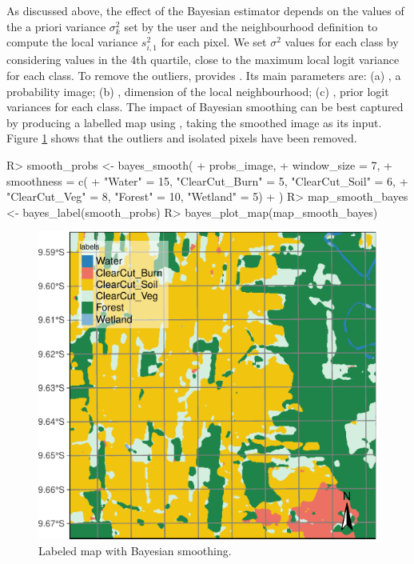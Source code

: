 \documentclass[
  shortnames]{jss}
\begin{document}
As discussed above, the effect of the Bayesian estimator depends on the values of the a priori variance \(\sigma^2_{k}\) set by the user and the neighbourhood definition to compute the local variance \(s^2_{i,1}\) for each pixel. We set \(\sigma^2\) values for each class by considering values in the 4th quartile, close to the maximum local logit variance for each class. To remove the outliers,  provides . Its main parameters are: (a) , a probability image; (b) , dimension of the local neighbourhood; (c) , prior logit variances for each class. The impact of Bayesian smoothing can be best captured by producing a labelled map using , taking the smoothed image as its input. Figure \ref{fig:smth1} shows that the outliers and isolated pixels have been removed.

\begin{CodeChunk}
\begin{CodeInput}
R> smooth_probs <- bayes_smooth(
+     probs_image,
+     window_size = 7,
+     smoothness = c(
+       "Water" = 15, "ClearCut_Burn" = 5, "ClearCut_Soil" = 6, 
+       "ClearCut_Veg" =  8, "Forest" = 10, "Wetland" = 5)
+ )
R> map_smooth_bayes <- bayes_label(smooth_probs)
R> bayes_plot_map(map_smooth_bayes)
\end{CodeInput}
\begin{figure}[h]

{\centering \includegraphics{Bayesian_smoothing_JSS_files/figure-latex/smth1-1} 

}

\caption[Labeled map with Bayesian  smoothing]{Labeled map with Bayesian  smoothing.}\label{fig:smth1}
\end{figure}
\end{CodeChunk}
\end{document}
